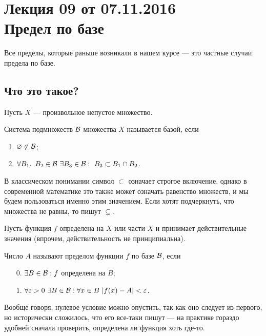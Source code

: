 \documentclass[a4paper, 12pt]{article}
\begin{document}
\pagestyle{fancy}
\section{Лекция 09 от 07.11.2016 \\ Предел по базе}
Все пределы, которые раньше возникали в нашем курсе --- это частные случаи предела по базе.

\subsection{Что это такое?}

Пусть $X$ --- произвольное непустое множество.

\begin{Def}
Система подмножеств $\mathcal{B}$ множества $X$ называется базой, если
\begin{enumerate}
\item $\varnothing \not\in \mathcal{B}$;
\item $\forall B_1,\ B_2 \in \mathcal{B}\ \exists B_3 \in \mathcal{B} :\ B_3 \subset B_1 \cap B_2$.
\end{enumerate}
\end{Def}

\begin{Comment}
В классическом понимании символ $\subset$ означает строгое включение, однако в современной математике это также может означать равенство множеств, и мы будем пользоваться именно этим значением. Если хотят подчеркнуть, что множества не равны, то пишут $\varsubsetneq$.
\end{Comment}

Пусть функция $f$ определена на $X$ или части $X$ и принимает действительные значения
(впрочем, действительность не принципиальна).
\begin{Def}
Число $A$ называют пределом функции $f$ по базе $\mathcal{B}$, если
\begin{itemize}
\item[0.] $\exists B \in \mathcal{B}: f$ определена на $B$;
\item[1.] $\forall \varepsilon > 0\ \exists B \in \mathcal{B}: \forall x \in B\ |f(x) - A| < \varepsilon$.
\end{itemize}
\end{Def}
Вообще говоря, нулевое условие можно опустить, так как оно следует из первого, но исторически сложилось, что его все-таки пишут --- на практике гораздо удобней сначала проверить, определена ли функция хоть где-то.
\end{document}
